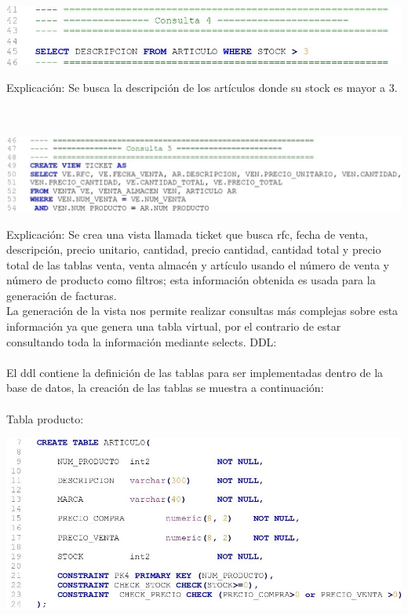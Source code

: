 \documentclass[letter,12pt]{article} %
\begin{document}
\newpage
\begin{center} 
\includegraphics{imagenes/B04.jpg}
\end{center}
Explicación: Se busca la descripción de los artículos donde su stock es mayor a 3.
\\\\\\
\begin{center} 
\includegraphics[scale=0.85]{imagenes/B05.jpg}
\end{center}
Explicación: Se crea una vista llamada ticket que busca rfc, fecha de venta, descripción, precio unitario, cantidad, precio cantidad, cantidad total y precio total de las tablas venta, venta almacén y artículo usando el número de venta y número de producto como filtros; esta información obtenida es usada para la generación de facturas.\\
La generación de la vista nos permite realizar consultas más complejas sobre esta información ya que genera una tabla virtual, por el contrario de estar consultando toda la información mediante selects. 
\newpage
DDL:
\\\\
El ddl contiene la definición de las tablas para ser implementadas dentro de la base de datos, la creación de las tablas se muestra a continuación:
\\\\
Tabla producto:
\begin{center} 
\includegraphics[scale=0.90]{imagenes/DDL01.jpg}
\end{center}
\end{document}
